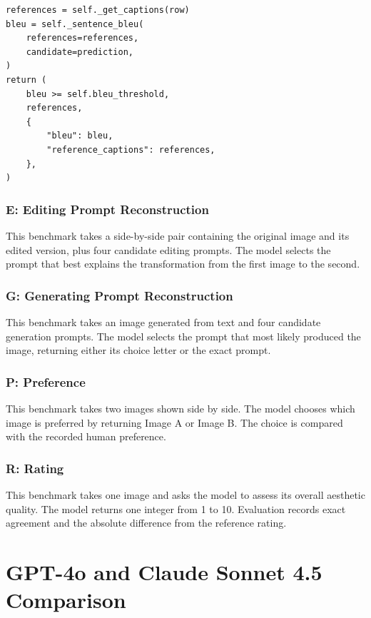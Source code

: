 ﻿\documentclass[11pt,a4paper]{article}
\begin{document}
\begin{lstlisting}[caption={Caption evaluation from
\texttt{benchmarks/captioning/\_captioning.py}.},
label={lst:caption-metric}]
references = self._get_captions(row)
bleu = self._sentence_bleu(
    references=references,
    candidate=prediction,
)
return (
    bleu >= self.bleu_threshold,
    references,
    {
        "bleu": bleu,
        "reference_captions": references,
    },
)
\end{lstlisting}

\subsubsection{\textbf{E}: Editing Prompt Reconstruction}

This benchmark takes a side-by-side pair containing the original image and its edited version, plus four candidate editing prompts. The model selects the prompt that best explains the transformation from the first image to the second.

\subsubsection{\textbf{G}: Generating Prompt Reconstruction}

This benchmark takes an image generated from text and four candidate generation prompts. The model selects the prompt that most likely produced the image, returning either its choice letter or the exact prompt.

\subsubsection{\textbf{P}: Preference}

This benchmark takes two images shown side by side. The model chooses which image is preferred by returning Image A or Image B. The choice is compared with the recorded human preference.

\subsubsection{\textbf{R}: Rating}

This benchmark takes one image and asks the model to assess its overall aesthetic quality. The model returns one integer from 1 to 10. Evaluation records exact agreement and the absolute difference from the reference rating.

\section{GPT-4o and Claude Sonnet 4.5 Comparison}
\end{document}
